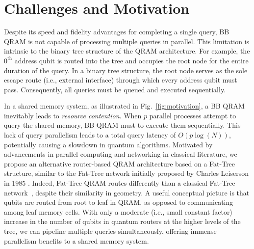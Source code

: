 \section{Challenges and Motivation}
\label{sec:app}

Despite its speed and fidelity advantages for completing a single query, BB QRAM is not capable of processing multiple queries in parallel. This limitation is intrinsic to the binary tree structure of the QRAM architecture. For example, the $0^{\text{th}}$ address qubit is routed into the tree and occupies the root node for the entire duration of the query. In a binary tree structure, the root node serves as the sole escape route (i.e., external interface) through which every address qubit must pass. Consequently, all queries must be queued and executed sequentially.

In a shared memory system, as illustrated in Fig.~\ref{fig:motivation}, a BB QRAM inevitably leads to \emph{resource contention}. When $p$ parallel processes attempt to query the shared memory, BB QRAM must to execute them sequentially. This lack of query parallelism leads to a total query latency of $O(p \log(N))$, potentially causing a slowdown in quantum algorithms. Motivated by advancements in parallel computing and networking in classical literature, we propose an alternative router-based QRAM architecture based on a Fat-Tree structure, similar to the Fat-Tree network initially proposed by Charles Leiserson in 1985 \cite{leiserson1985fat}. 
Indeed, Fat-Tree QRAM routes differently than a classical Fat-Tree network~\cite{leiserson1985fat}, despite their similarity in geometry. A useful conceptual picture is that qubits are routed from root to leaf in QRAM, as opposed to communicating among leaf memory cells. With only a moderate (i.e., small constant factor) increase in the number of qubits in quantum routers at the higher levels of the tree, we can pipeline multiple queries simultaneously, offering immense parallelism benefits to a shared memory system.
